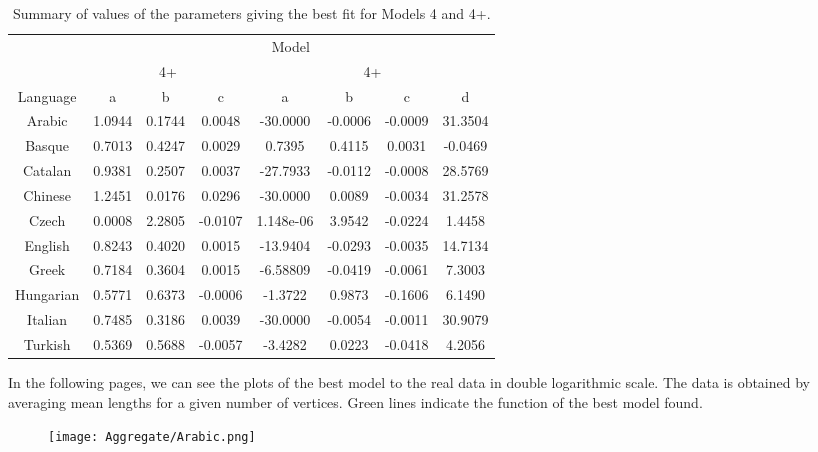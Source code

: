 \documentclass{article}
\begin{document}
\begin{table}[H]
\centering
\begin{tabular}{c|ccc|cccc|}
    \cline{2-8}
    & \multicolumn{7}{c|}{Model} \\
    \cline{2-8}
    & \multicolumn{3}{c|}{4+} & \multicolumn{4}{c|}{4+} \\
    \hline
    \multicolumn{1}{|c|}{Language}  & a & b & c & a & b & c & d\\
    \hline
    \multicolumn{1}{|c|}{Arabic}    & 1.0944  & 0.1744  & 0.0048 & -30.0000 & -0.0006 & -0.0009 & 31.3504 \\
    \multicolumn{1}{|c|}{Basque}    & 0.7013  & 0.4247  & 0.0029 & 0.7395 & 0.4115 & 0.0031 & -0.0469\\
    \multicolumn{1}{|c|}{Catalan}   & 0.9381  & 0.2507  & 0.0037 & -27.7933 & -0.0112 & -0.0008 & 28.5769 \\
    \multicolumn{1}{|c|}{Chinese}   & 1.2451  & 0.0176  & 0.0296 & -30.0000 & 0.0089 & -0.0034 & 31.2578 \\
    \multicolumn{1}{|c|}{Czech}     & 0.0008  & 2.2805  & -0.0107 & 1.148e-06 & 3.9542 & -0.0224 & 1.4458\\
    \multicolumn{1}{|c|}{English}   & 0.8243  & 0.4020  & 0.0015 & -13.9404 & -0.0293 & -0.0035 & 14.7134 \\
    \multicolumn{1}{|c|}{Greek}     & 0.7184  & 0.3604  & 0.0015 & -6.58809 & -0.0419 & -0.0061 & 7.3003 \\
    \multicolumn{1}{|c|}{Hungarian} & 0.5771  & 0.6373  & -0.0006 & -1.3722 & 0.9873 & -0.1606 & 6.1490 \\
    \multicolumn{1}{|c|}{Italian}   & 0.7485  & 0.3186  & 0.0039 & -30.0000 & -0.0054 & -0.0011 & 30.9079 \\
    \multicolumn{1}{|c|}{Turkish}   & 0.5369  & 0.5688  & -0.0057 & -3.4282 & 0.0223 & -0.0418 & 4.2056\\
    \hline
\end{tabular}
\label{Table:T8}
\caption{Summary of values of the parameters giving the best fit for Models 4 and 4+.}
\end{table}

In the following pages, we can see the plots of the best model to the real data in double logarithmic scale. The data is obtained by averaging mean lengths for a given number of vertices. Green lines indicate the function of the best model found.

\newpage

\begin{figure}[H]
\centering
\texttt{[image: Aggregate/Arabic.png]}
\label{fig:globfig}
\end{figure}
\end{document}
